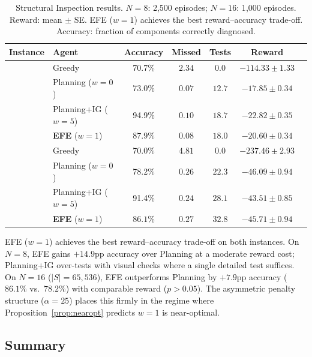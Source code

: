 \documentclass[runningheads]{llncs}
\begin{document}
\begin{table}[ht]
\centering
\caption{Structural Inspection results. $N{=}8$: 2{,}500 episodes; $N{=}16$: 1{,}000 episodes. Reward: mean $\pm$ SE. EFE ($w{=}1$) achieves the best reward--accuracy trade-off. Accuracy: fraction of components correctly diagnosed.}
\label{tab:inspection}
\begin{small}
\begin{tabular}{llccccc}
\toprule
Instance & Agent & Accuracy & Missed & Tests & Reward \\
\midrule
{} & Greedy & 70.7\% & $2.34$ & $0.0$ & $-114.33 \pm 1.33$ \\
& Planning ($w{=}0$) & 73.0\% & $0.07$ & $12.7$ & $-17.85 \pm 0.34$ \\
& Planning+IG ($w{=}5$) & 94.9\% & $0.10$ & $18.7$ & $-22.82 \pm 0.35$ \\
& \textbf{EFE} ($w{=}1$) & $\mathbf{87.9\%}$ & $\mathbf{0.08}$ & $18.0$ & $\mathbf{-20.60 \pm 0.34}$ \\
\midrule
{} & Greedy & 70.0\% & $4.81$ & $0.0$ & $-237.46 \pm 2.93$ \\
& Planning ($w{=}0$) & 78.2\% & $0.26$ & $22.3$ & $-46.09 \pm 0.94$ \\
& Planning+IG ($w{=}5$) & 91.4\% & $0.24$ & $28.1$ & $-43.51 \pm 0.85$ \\
& \textbf{EFE} ($w{=}1$) & $\mathbf{86.1\%}$ & $\mathbf{0.27}$ & $32.8$ & $\mathbf{-45.71 \pm 0.94}$ \\
\bottomrule
\end{tabular}
\end{small}
\end{table}

EFE ($w{=}1$) achieves the best reward--accuracy trade-off on both instances. On $N{=}8$, EFE gains $+14.9$pp accuracy over Planning at a moderate reward cost; Planning+IG over-tests with visual checks where a single detailed test suffices. On $N{=}16$ ($|S|{=}65{,}536$), EFE outperforms Planning by $+7.9$pp accuracy ($86.1\%$ vs.\ $78.2\%$) with comparable reward ($p > 0.05$). The asymmetric penalty structure ($\alpha = 25$) places this firmly in the regime where Proposition~\ref{prop:nearopt} predicts $w{=}1$ is near-optimal.

\subsection{Summary}
\end{document}
